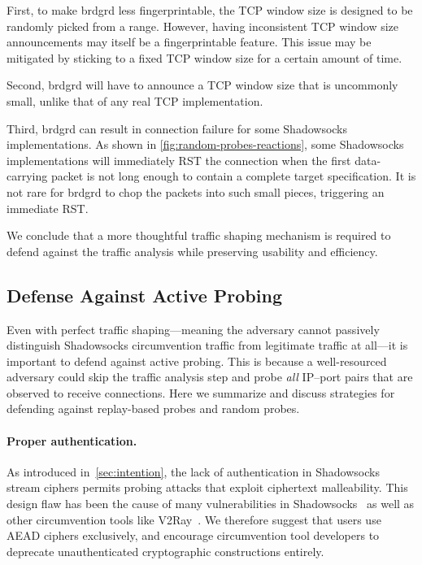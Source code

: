 \documentclass[sigconf,letterpaper]{acmart}
\begin{document}
First, to make brdgrd less fingerprintable, the TCP window size is designed to be randomly picked from a range. However, having inconsistent TCP window size announcements may itself be a fingerprintable feature. This issue may be mitigated by sticking to a fixed TCP window size for a certain amount of time.

Second, brdgrd will have to announce a TCP window size that is uncommonly small,
unlike that of any real TCP implementation.

Third, brdgrd can result in connection failure for some Shadowsocks implementations.
As shown in \autoref{fig:random-probes-reactions}, some Shadowsocks implementations will immediately RST the connection
when the first data-carrying packet is not long enough to contain a complete target specification.
It is not rare for brdgrd to chop the packets into such small pieces, triggering an immediate RST.

We conclude that a more thoughtful traffic shaping mechanism is required to defend against the traffic analysis while preserving usability and efficiency.

\subsection{Defense Against Active Probing}

Even with perfect traffic shaping---meaning
the adversary cannot passively distinguish Shadowsocks circumvention traffic from legitimate traffic at all---it
is important to defend against active probing.
This is because a well-resourced adversary could skip the traffic analysis step and probe
\emph{all} IP--port pairs that are observed to receive connections.
Here we summarize and discuss strategies for defending against replay-based probes and random probes.

\paragraph{Proper authentication.}
As introduced in~\autoref{sec:intention},
the lack of authentication in Shadowsocks stream ciphers
permits probing attacks that exploit ciphertext malleability.
This design flaw has been the cause of
many vulnerabilities in Shadowsocks~\cite{BreakWa112015, Fifield2017-summary, printempw2017, Fifield2017-summary, Peng2020Redirect, Fifield2020Redirect}
as well as other circumvention tools like V2Ray~\cite{v2ray-replay-1, v2ray-replay-summary}.
We therefore suggest that users use AEAD ciphers exclusively,
and encourage circumvention tool developers to deprecate unauthenticated cryptographic constructions entirely.
\end{document}
